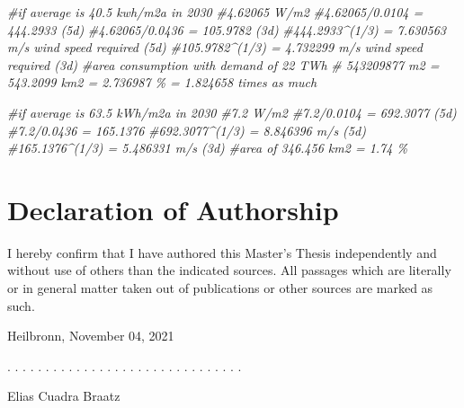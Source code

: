 \documentclass[a4paper,11pt]{article}
\newcommand{\thesistype}{Master's Thesis}
\newcommand{\thesisauthor}{Elias Cuadra Braatz}
\newcommand{\thesisdate}{November 04, 2021}
\newenvironment{Shaded}{\begin{snugshade}}{\end{snugshade}}
\newcommand{\CommentTok}[1]{\textcolor[rgb]{0.56,0.35,0.01}{\textit{#1}}}
\begin{document}
\begin{Shaded}
\begin{Highlighting}[]
\CommentTok{\#if average is 40.5 kwh/m2a in 2030}
\CommentTok{\#4.62065 W/m2}
\CommentTok{\#4.62065/0.0104 = 444.2933 (5d)}
\CommentTok{\#4.62065/0.0436 = 105.9782 (3d)}
\CommentTok{\#444.2933\^{}(1/3) = 7.630563 m/s wind speed required (5d)}
\CommentTok{\#105.9782\^{}(1/3) = 4.732299 m/s wind speed required (3d)}
\CommentTok{\#area consumption with demand of 22 TWh}
\CommentTok{\# 543209877 m2 = 543.2099 km2 = 2.736987 \% = 1.824658 times as much}

\CommentTok{\#if average is 63.5 kWh/m2a in 2030}
\CommentTok{\#7.2 W/m2}
\CommentTok{\#7.2/0.0104 = 692.3077 (5d)}
\CommentTok{\#7.2/0.0436 = 165.1376}
\CommentTok{\#692.3077\^{}(1/3) = 8.846396 m/s (5d)}
\CommentTok{\#165.1376\^{}(1/3) = 5.486331 m/s (3d)}
\CommentTok{\#area of 346.456 km2 = 1.74 \%}
\end{Highlighting}
\end{Shaded}





\newpage
\thispagestyle{empty}
\hypertarget{declaration-of-authorship}{%
\section*{Declaration of Authorship}\label{declaration-of-authorship}}

I hereby confirm that I have authored this \thesistype{} independently and
without use of others than the indicated sources. All passages which are
literally or in general matter taken out of publications or other sources are
marked as such.
\vspace{1cm}

Heilbronn, \thesisdate{}
\vspace{3cm}

. . . . . . . . . . . . . . . . . . . . . . . . . . . . . . .
\vspace{0.1cm}

\thesisauthor{}
\end{document}

